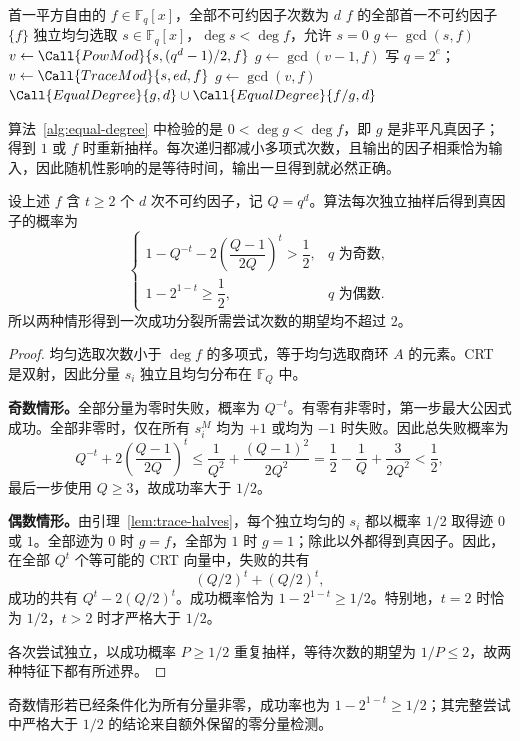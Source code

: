 \documentclass[lang=cn,a4paper,fontset=none,zihao=false,10pt,openany,twoside]{beautybook}
\numberwithin{algorithm}{chapter}
\begin{document}
\begin{algorithm}[htbp]
\caption{任意有限域上的等次数分解}\label{alg:equal-degree}
\begin{algorithmic}[1]
\Require 首一平方自由的 $f\in\mathbb F_q[x]$，全部不可约因子次数为 $d$
\Ensure $f$ 的全部首一不可约因子
  \State \Return $\{f\}$
 \EndIf
 \Loop
  \State 独立均匀选取 $s\in\mathbb F_q[x]$，$\deg s<\deg f$，允许 $s=0$
   \State $g\gets\gcd(s,f)$
    \State $v\gets\Call{PowMod}{s,(q^d-1)/2,f}$
    \State $g\gets\gcd(v-1,f)$
   \EndIf
  \Else
   \State 写 $q=2^e$；$v\gets\Call{TraceMod}{s,ed,f}$
   \State $g\gets\gcd(v,f)$
  \EndIf
   \State \Return $\Call{EqualDegree}{g,d}\cup\Call{EqualDegree}{f/g,d}$
  \EndIf
 \EndLoop
\EndFunction
\end{algorithmic}
\end{algorithm}
算法~\ref{alg:equal-degree} 中检验的是 $0<\deg g<\deg f$，即 $g$ 是非平凡真因子；得到 $1$ 或 $f$ 时重新抽样。每次递归都减小多项式次数，且输出的因子相乘恰为输入，因此随机性影响的是等待时间，输出一旦得到就必然正确。

\Needspace{45mm}
\begin{proposition}[一次随机尝试的成功率]
设上述 $f$ 含 $t\ge2$ 个 $d$ 次不可约因子，记 $Q=q^d$。算法每次独立抽样后得到真因子的概率为
\[
 \begin{cases}
 1-Q^{-t}-2\left(\dfrac{Q-1}{2Q}\right)^t>\dfrac12,&q\text{ 为奇数},\\[1mm]
 1-2^{1-t}\ge\dfrac12,&q\text{ 为偶数}.
 \end{cases}
\]
所以两种情形得到一次成功分裂所需尝试次数的期望均不超过 $2$。
\end{proposition}
\begin{proof}
均匀选取次数小于 $\deg f$ 的多项式，等于均匀选取商环 $A$ 的元素。CRT 是双射，因此分量 $s_i$ 独立且均匀分布在 $\mathbb F_Q$ 中。

\par\smallskip\noindent\textbf{奇数情形。}\quad 全部分量为零时失败，概率为 $Q^{-t}$。有零有非零时，第一步最大公因式成功。全部非零时，仅在所有 $s_i^M$ 均为 $+1$ 或均为 $-1$ 时失败。因此总失败概率为
\[
 Q^{-t}+2\left(\frac{Q-1}{2Q}\right)^t
 \le\frac1{Q^2}+\frac{(Q-1)^2}{2Q^2}
 =\frac12-\frac1Q+\frac{3}{2Q^2}<\frac12,
\]
最后一步使用 $Q\ge3$，故成功率大于 $1/2$。

\par\smallskip\noindent\textbf{偶数情形。}\quad 由引理~\ref{lem:trace-halves}，每个独立均匀的 $s_i$ 都以概率 $1/2$ 取得迹 $0$ 或 $1$。全部迹为 $0$ 时 $g=f$，全部为 $1$ 时 $g=1$；除此以外都得到真因子。因此，在全部 $Q^t$ 个等可能的 CRT 向量中，失败的共有
\[
 (Q/2)^t+(Q/2)^t,
\]
成功的共有 $Q^t-2(Q/2)^t$。成功概率恰为 $1-2^{1-t}\ge1/2$。特别地，$t=2$ 时恰为 $1/2$，$t>2$ 时才严格大于 $1/2$。

各次尝试独立，以成功概率 $P\ge1/2$ 重复抽样，等待次数的期望为 $1/P\le2$，故两种特征下都有所述界。
\end{proof}
奇数情形若已经条件化为所有分量非零，成功率也为 $1-2^{1-t}\ge1/2$；其完整尝试中严格大于 $1/2$ 的结论来自额外保留的零分量检测。
\end{document}
